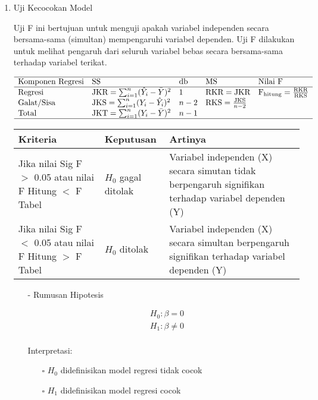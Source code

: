 \begin{enumerate}
\item Uji Kecocokan Model \\
\begin{sloppypar}
Uji F ini bertujuan untuk menguji apakah variabel independen secara bersama-sama (simultan) mempengaruhi variabel dependen. Uji F dilakukan untuk melihat pengaruh dari seluruh variabel bebas secara bersama-sama terhadap variabel terikat. 
\end{sloppypar}
$$\begin{array}{llllll}
    \hline 
    \text{Komponen Regresi} & \text{SS} & \text{db} & \text{MS} & \text{Nilai F} \\
    \hline 
    \text{Regresi} & \text{JKR} = \sum_{i=1}^{n}(\hat{Y}_i - \bar{Y})^2 & 1 & \text{RKR} = \text{JKR} & \text{F}_\text{hitung} = \frac{\text{RKR}}{\text{RKS}} \\
    \text{Galat/Sisa} & \text{JKS} = \sum_{i=1}^{n}(Y_i - \hat{Y}_i)^2 & n-2 & \text{RKS} = \frac{\text{JKS}}{n-2} \\
    \text{Total} & \text{JKT} = \sum_{i=1}^{n}(Y_i - \bar{Y})^2 & n-1 \\
    \hline
\end{array}$$
\begin{table}[h]
    \begin{tabular}{p{4cm} p{2.5cm} p{6cm}}
        \toprule
\textbf{Kriteria} & \textbf{Keputusan} & \textbf{Artinya} \\
        \midrule
Jika nilai Sig F $>$ 0.05 atau nilai F Hitung $<$ F Tabel
& $H_0$ gagal ditolak 
& Variabel independen (X) secara simutan tidak berpengaruh signifikan terhadap variabel dependen (Y) \\  
Jika nilai Sig F $<$ 0.05 atau nilai F Hitung $>$ F Tabel
& $H_0$ ditolak       
& Variabel independen (X) secara simultan berpengaruh signifikan terhadap variabel dependen (Y) \\
        \bottomrule
    \end{tabular}
\end{table}
\begin{test}{
    \begin{enumerate}
    \item[-] Rumusan Hipotesis \\
    \begin{fleqn}[\parindent]
        \begin{equation*}
        \begin{split}
        &H_0 : \beta = 0 \\ 
        &H_1 : \beta \neq 0 \\
        \end{split}
        \end{equation*}
    \end{fleqn}
    Interpretasi:
    \begin{enumerate}
    \item[$\square$] $H_0$ didefinisikan model regresi tidak cocok
    \item[$\square$] $H_1$ didefinisikan model regresi cocok
    \end{enumerate}


\end{enumerate}}
\end{test}
\end{enumerate}
